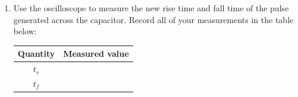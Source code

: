\begin{enumerate}
  
\item  Use the oscilloscope to measure the new rise time and fall time of the pulse generated across the  capacitor. Record all of your measurements in the table below:

  \begin{center}
   \begin{tabular}{|c|c|}
    \toprule
    Quantity & Measured value\\
    \toprule
     $t_r$ & \\
     \hline
     $t_f$ & \\
    \bottomrule
   \end{tabular}    
  \end{center}

  

 \end{enumerate}


